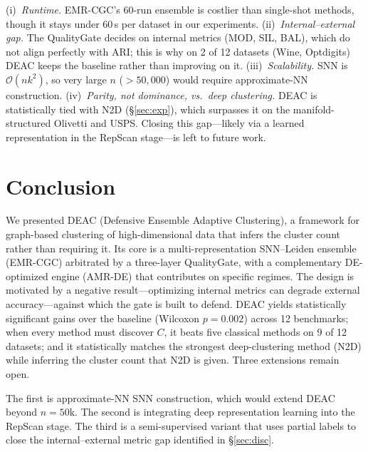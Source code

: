 \documentclass[journal]{IEEEtran}
\begin{document}
(i)~\emph{Runtime.} EMR-CGC's 60-run ensemble is costlier than single-shot methods, though it stays under 60\,s per dataset in our experiments.
(ii)~\emph{Internal--external gap.} The QualityGate decides on internal metrics (MOD, SIL, BAL), which do not align perfectly with ARI; this is why on 2 of 12 datasets (Wine, Optdigits) DEAC keeps the baseline rather than improving on it.
(iii)~\emph{Scalability.} SNN is $\mathcal{O}(n k^2)$, so very large $n$ ($>50{,}000$) would require approximate-NN construction.
(iv)~\emph{Parity, not dominance, vs.\ deep clustering.} DEAC is statistically tied with N2D (\S\ref{sec:exp}), which surpasses it on the manifold-structured Olivetti and USPS. Closing this gap---likely via a learned representation in the RepScan stage---is left to future work.

\section{Conclusion}\label{sec:conc}

We presented DEAC (Defensive Ensemble Adaptive Clustering), a framework for graph-based clustering of high-dimensional data that infers the cluster count rather than requiring it. Its core is a multi-representation SNN--Leiden ensemble (EMR-CGC) arbitrated by a three-layer QualityGate, with a complementary DE-optimized engine (AMR-DE) that contributes on specific regimes. The design is motivated by a negative result---optimizing internal metrics can degrade external accuracy---against which the gate is built to defend. DEAC yields statistically significant gains over the baseline (Wilcoxon $p{=}0.002$) across 12 benchmarks; when every method must discover $C$, it beats five classical methods on 9 of 12 datasets; and it statistically matches the strongest deep-clustering method (N2D) while inferring the cluster count that N2D is given. Three extensions remain open.

The first is approximate-NN SNN construction, which would extend DEAC beyond $n{=}50$k. The second is integrating deep representation learning into the RepScan stage. The third is a semi-supervised variant that uses partial labels to close the internal--external metric gap identified in \S\ref{sec:disc}.
\end{document}
